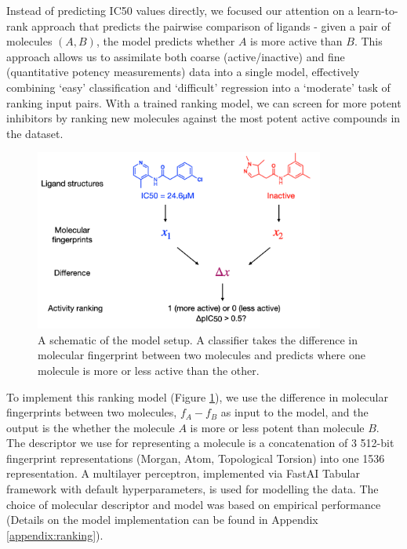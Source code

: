 Instead of predicting IC50 values directly, we focused our attention on a learn-to-rank approach \cite{duffy2010molecular,agarwal2010ranking} that predicts the pairwise comparison of ligands - given a pair of molecules $(A,B)$, the model predicts whether $A$ is more active than $B$. This approach allows us to assimilate both coarse (active/inactive) and fine (quantitative potency measurements) data into a single model, effectively combining `easy' classification and `difficult' regression into a `moderate' task of ranking input pairs. With a trained ranking model, we can screen for more potent inhibitors by ranking new molecules against the most potent active compounds in the dataset.

\begin{figure}[!th]
    \centering
    \includegraphics[width=0.85\textwidth]{Chapters/Ranking/Figs/schematic.png}
    \caption{A schematic of the model setup. A classifier takes the difference in molecular fingerprint between two molecules and predicts where one molecule is more or less active than the other.}
    \label{fig:ranking_schematic}
\end{figure}

To implement this ranking model (Figure \ref{fig:ranking_schematic}), we use the difference in molecular fingerprints between two molecules, $f_A - f_B$ as input to the model, and the output is the whether the molecule $A$ is more or less potent than molecule $B$. The descriptor we use for representing a molecule is a concatenation of 3 512-bit fingerprint representations (Morgan, Atom, Topological Torsion) into one 1536 representation. A multilayer perceptron, implemented via FastAI Tabular framework \cite{howard2018fastai} with default hyperparameters, is used for modelling the data. The choice of molecular descriptor and model was based on empirical performance (Details on the model implementation can be found in Appendix \ref{appendix:ranking}). %

